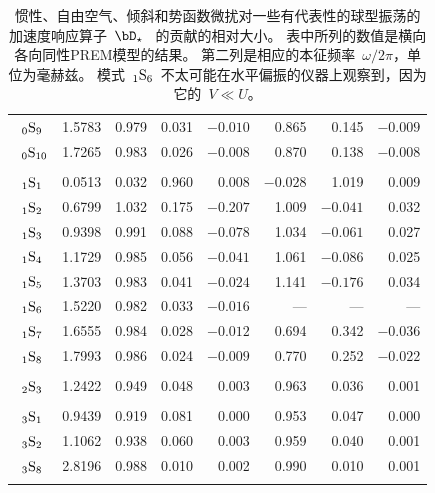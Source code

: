 \begin{table}[!t]
\begin{tabular}{|l|c|rrr|rrr|}
$\hspace{1.5 mm}{}_{0}{\rm S}_{9}$ & 1.5783 & 0.979 & 0.031 & $-0.010$ & 0.865 & 0.145 & $-0.009$ \\
$\hspace{1.5 mm}{}_{0}{\rm S}_{10}$ & 1.7265 & 0.983 & 0.026 & $-0.008$ & 0.870 & 0.138 & $-0.008$ \\
& & & & & & & \\
$\hspace{1.5 mm}{}_{1}{\rm S}_{1}$ & 0.0513 & 0.032 & 0.960 & 0.008 & $-0.028$ & 1.019 & 0.009 \\
$\hspace{1.5 mm}{}_{1}{\rm S}_{2}$ & 0.6799 & 1.032 & 0.175 & $-0.207$ & 1.009 & $-0.041$ & 0.032 \\
$\hspace{1.5 mm}{}_{1}{\rm S}_{3}$ & 0.9398 & 0.991 & 0.088 & $-0.078$ & 1.034 & $-0.061$ & 0.027 \\
$\hspace{1.5 mm}{}_{1}{\rm S}_{4}$ & 1.1729 & 0.985 & 0.056 & $-0.041$ & 1.061 & $-0.086$ & 0.025 \\
$\hspace{1.5 mm}{}_{1}{\rm S}_{5}$ & 1.3703 & 0.983 & 0.041 & $-0.024$ & 1.141 & $-0.176$ & 0.034 \\
$\hspace{1.5 mm}{}_{1}{\rm S}_{6}$ & 1.5220 & 0.982 & 0.033 & $-0.016$
      & ---\hspace{2.0 mm} & ---\hspace{2.0 mm} & ---\hspace{2.0 mm} \\
$\hspace{1.5 mm}{}_{1}{\rm S}_{7}$ & 1.6555 & 0.984 & 0.028 & $-0.012$ & 0.694 & 0.342 & $-0.036$ \\
$\hspace{1.5 mm}{}_{1}{\rm S}_{8}$ & 1.7993 & 0.986 & 0.024 & $-0.009$ & 0.770 & 0.252 & $-0.022$ \\
& & & & & & & \\
$\hspace{1.5 mm}{}_{2}{\rm S}_{3}$ & 1.2422 & 0.949 & 0.048 & 0.003 & 0.963 & 0.036 & 0.001 \\
& & & & & & & \\
$\hspace{1.5 mm}{}_{3}{\rm S}_{1}$ & 0.9439 & 0.919 & 0.081 & 0.000 & 0.953 & 0.047 & 0.000 \\
$\hspace{1.5 mm}{}_{3}{\rm S}_{2}$ & 1.1062 & 0.938 & 0.060 & 0.003 & 0.959 & 0.040 & 0.001 \\
$\hspace{1.5 mm}{}_{3}{\rm S}_{8}$ & 2.8196 & 0.988 & 0.010 & 0.002 & 0.990 & 0.010 & 0.001 \\
& & & & & & & \\ \hline
\end{tabular}
\caption[accelresponse]
{惯性、自由空气、倾斜和势函数微扰对一些有代表性的球型振荡的加速度响应算子~$\bD_{\star}$ 
~的贡献的相对大小。
表中所列的数值是横向各向同性PREM模型的结果。
第二列是相应的本征频率~$\omega/2\pi$，单位为毫赫兹。
模式~${}_1{\rm S}_6$~不太可能在水平偏振的仪器上观察到，因为它的~$V\ll U$。}
\label{10.table}
\end{table}
